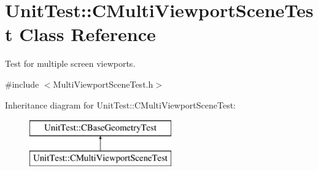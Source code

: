 \hypertarget{class_unit_test_1_1_c_multi_viewport_scene_test}{}\section{Unit\+Test\+::C\+Multi\+Viewport\+Scene\+Test Class Reference}
\label{class_unit_test_1_1_c_multi_viewport_scene_test}


Test for multiple screen viewports.  




{\ttfamily \#include $<$Multi\+Viewport\+Scene\+Test.\+h$>$}

Inheritance diagram for Unit\+Test\+::C\+Multi\+Viewport\+Scene\+Test\+:\begin{figure}[H]
\begin{center}
\leavevmode
\includegraphics[height=2.000000cm]{class_unit_test_1_1_c_multi_viewport_scene_test}
\end{center}
\end{figure}
